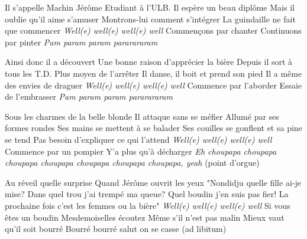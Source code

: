 \footnotemark [
ititle={Complainte de machin Jerome, la},
tu={Summer Nights (Grease)}]


\beginverse
Il s'appelle Machin Jérôme
Etudiant à l'ULB.
Il espère un beau diplôme
Mais il oublie qu'il aime s'amuser
Montrons-lui comment s'intégrer
La guindaille ne fait que commencer
\emph{Well(e) well(e) well(e) well}
Commençons par chanter
Continuons par pinter
\emph{Pam param param pararararam}
\endverse

\beginverse
Ainsi donc il a découvert
Une bonne raison d'apprécier la bière
Depuis il sort à tous les T.D.
Plus moyen de l'arrêter
Il danse, il boit et prend son pied
Il a même des envies de draguer
\emph{Well(e) well(e) well(e) well}
Commence par l'aborder
Essaie de l'embrasser
\emph{Pam param param pararararam}
\endverse

\beginverse
Sous les charmes de la belle blonde
Il attaque sans se méfier
Allumé par ses formes rondes
Ses mains se mettent à se balader
Ses couilles se gonflent et sa pine se tend
Pas besoin d'expliquer ce qui l'attend
\emph{Well(e) well(e) well(e) well}
Commence par un pompier
Y'a plus qu'à décharger
\emph{Eh choupapa choupapa choupapa choupapa choupapa choupapa 
	choupapa, yeah} (point d'orgue)
\endverse

\beginverse
Au réveil quelle surprise
Quand Jérôme ouvrit les yeux
"Nondidju quelle fille ai-je mise?
Dans quel trou j'ai trempé ma queue?
Quel boudin j'en suis pas fier!
La prochaine fois c'est les femmes ou la bière"
\emph{Well(e) well(e) well(e) well}
Si vous êtes un boudin
Mesdemoiselles écoutez
Même s'il n'est pas malin
Mieux vaut qu'il soit bourré
Bourré bourré salut on se casse (ad libitum)
\endverse
\endsong